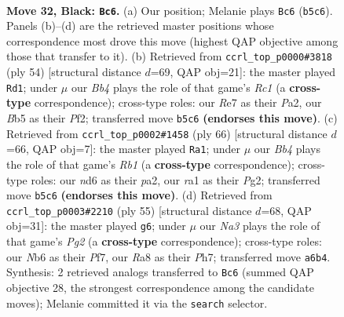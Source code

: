 \documentclass[11pt]{article}
\begin{document}
\clearpage

\begin{figure}[p]\centering
\begin{subfigure}{0.46\textwidth}\centering
\resizebox{\linewidth}{!}{%
\newchessgame
\chessboard[
  setfen={r5k1/4rppp/nn1N4/pb2p1P1/8/1P2P1R1/P5PP/RN1B3K b - - 3 32},
  showmover=false,
  pgfstyle=straightmove, color=movearrow, markmove={b5-c6}
]}
\caption{}
\end{subfigure}\hfill
\begin{subfigure}{0.46\textwidth}\centering
\resizebox{\linewidth}{!}{%
\newchessgame
\chessboard[
  setfen={5rk1/1r3p1p/p5pb/Bp6/6n1/1P6/P1N2PPP/1RR3K1 w - - 2 28},
  showmover=false,
  pgfstyle=straightmove, color=movearrow, markmove={c1-d1}
]}
\caption{}
\end{subfigure}
\\[4pt]
\begin{subfigure}{0.46\textwidth}\centering
\resizebox{\linewidth}{!}{%
\newchessgame
\chessboard[
  setfen={3b3k/1r4p1/1n1Bpp1p/rP6/3PP3/2R1N2P/p4PP1/1R4K1 w - - 0 34},
  showmover=false,
  pgfstyle=straightmove, color=movearrow, markmove={b1-a1}
]}
\caption{}
\end{subfigure}\hfill
\begin{subfigure}{0.46\textwidth}\centering
\resizebox{\linewidth}{!}{%
\newchessgame
\chessboard[
  setfen={r7/1p2kppp/p1brn3/8/1PB1p3/P1N1P2P/2R2PP1/1R4K1 b - - 5 28},
  showmover=false,
  pgfstyle=straightmove, color=movearrow, markmove={g7-g6}
]}
\caption{}
\end{subfigure}
\caption{\textbf{Move 32, Black: \texttt{Bc6}.} (a) Our position; Melanie plays \texttt{Bc6} (\texttt{b5c6}). Panels (b)--(d) are the retrieved master positions whose correspondence most drove this move (highest QAP objective among those that transfer to it). (b) Retrieved from \texttt{ccrl\_top\_p0000\#3818} (ply 54) [structural distance $d$=69, QAP obj=21]: the master played \texttt{Rd1}; under $\mu$ our \emph{Bb4} plays the role of that game's \emph{Rc1} (a \textbf{cross-type} correspondence); cross-type roles: our \emph{R}e7 as their \emph{P}a2, our \emph{B}b5 as their \emph{P}f2; transferred move \texttt{b5c6} \textbf{(endorses this move)}. (c) Retrieved from \texttt{ccrl\_top\_p0002\#1458} (ply 66) [structural distance $d$=66, QAP obj=7]: the master played \texttt{Ra1}; under $\mu$ our \emph{Bb4} plays the role of that game's \emph{Rb1} (a \textbf{cross-type} correspondence); cross-type roles: our \emph{n}d6 as their \emph{p}a2, our \emph{r}a1 as their \emph{P}g2; transferred move \texttt{b5c6} \textbf{(endorses this move)}. (d) Retrieved from \texttt{ccrl\_top\_p0003\#2210} (ply 55) [structural distance $d$=68, QAP obj=31]: the master played \texttt{g6}; under $\mu$ our \emph{Na3} plays the role of that game's \emph{Pg2} (a \textbf{cross-type} correspondence); cross-type roles: our \emph{N}b6 as their \emph{P}f7, our \emph{R}a8 as their \emph{P}h7; transferred move \texttt{a6b4}. Synthesis: 2 retrieved analogs transferred to \texttt{Bc6} (summed QAP objective 28, the strongest correspondence among the candidate moves); Melanie committed it via the \texttt{search} selector.}
\label{fig:thought-m63}
\end{figure}
\end{document}
